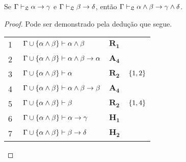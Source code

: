 \vspace{\baselineskip}
\begin{tcolorbox}[enhanced jigsaw, breakable, sharp corners, colframe=black, colback=white, boxrule=0.5pt, left=1.5mm, right=1.5mm, top=1.5mm, bottom=1.5mm]
    \begin{lemma}\label{conjunction.exchange}
        Se $\Gamma\mathrel{\vdash}_\mathfrak{L}\alpha\to\gamma$ e $\Gamma\mathrel{\vdash}_\mathfrak{L}\beta\to\delta$, então $\Gamma\mathrel{\vdash}_\mathfrak{L}\alpha\wedge\beta\to\gamma\wedge\delta$.
        \begin{proof}
        Pode ser demonstrado pela dedução que segue.

        \vspace{0.5\baselineskip}
        \footnotesize
        \setlength{\rowskip}{0.5\baselineskip}
        \begin{xltabular}{\textwidth}{r | X l l}
            \scriptsize{\phantom{0}1}\phantom{ } & $\ \Gamma\cup\set{\alpha\wedge\beta}\vdash\alpha\wedge\beta$                     & $\hyperref[modal.rule.1]{\mathbf{R_1}}$\phantom{1} & \\[\rowskip]
            \scriptsize{\phantom{0}2}\phantom{ } & $\ \Gamma\cup\set{\alpha\wedge\beta}\vdash\alpha\wedge\beta\to\alpha$            & $\hyperref[modal.axiom.4]{\mathbf{A_4}}$           & \\[\rowskip]
            \scriptsize{\phantom{0}3}\phantom{ } & $\ \Gamma\cup\set{\alpha\wedge\beta}\vdash\alpha$                                & $\hyperref[modal.rule.2]{\mathbf{R_2}}$            & $\left\{1,2\right\}$\\[\rowskip]
            \scriptsize{\phantom{0}4}\phantom{ } & $\ \Gamma\cup\set{\alpha\wedge\beta}\vdash\alpha\wedge\beta\to\beta$             & $\hyperref[modal.axiom.4]{\mathbf{A_4}}$           & \\[\rowskip]
            \scriptsize{\phantom{0}5}\phantom{ } & $\ \Gamma\cup\set{\alpha\wedge\beta}\vdash\beta$                                 & $\hyperref[modal.rule.2]{\mathbf{R_2}}$            & $\left\{1,4\right\}$\\[\rowskip]
            \scriptsize{\phantom{0}6}\phantom{ } & $\ \Gamma\cup\set{\alpha\wedge\beta}\vdash\alpha\to\gamma$                       & $\mathbf{H_1}$                                     & \\[\rowskip]
            \scriptsize{\phantom{0}7}\phantom{ } & $\ \Gamma\cup\set{\alpha\wedge\beta}\vdash\beta\to\delta$                        & $\mathbf{H_2}$                                     & \\[\rowskip]

\end{xltabular}
\end{proof}
\end{lemma}
\end{tcolorbox}
